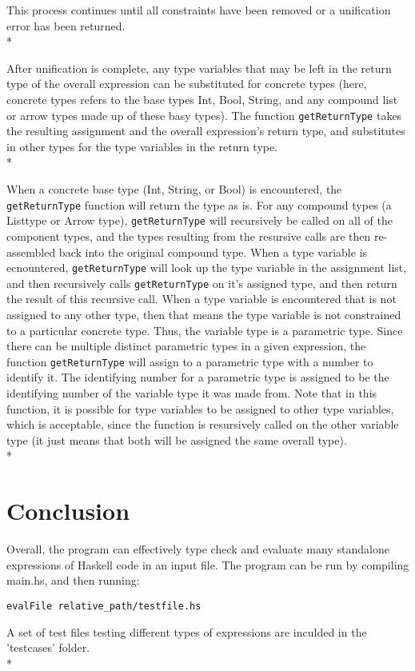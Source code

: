 \documentclass[11pt]{article}
\begin{document}
This process continues until all constraints have been removed or a unification error has been returned.\\*

After unification is complete, any type variables that may be left in the return type of the overall expression can be substituted for concrete types (here, concrete types refers to the base types Int, Bool, String, and any compound list or arrow types made up of these basy types). The function \verb|getReturnType| takes the resulting assignment and the overall expression's return type, and substitutes in other types for the type variables in the return type.\\*

When a concrete base type (Int, String, or Bool) is encountered, the \verb|getReturnType| function will return the type as is. For any compound types (a Listtype or Arrow type), \verb|getReturnType| will recursively be called on all of the component types, and the types resulting from the resursive calls are then re-assembled back into the original compound type. When a type variable is ecnountered, \verb|getReturnType| will look up the type variable in the assignment list, and then recursively calls \verb|getReturnType| on it's assigned type, and then return the result of this recursive call. When a type variable is encountered that is not assigned to any other type, then that means the type variable is not constrained to a particular concrete type. Thus, the variable type is a parametric type. Since there can be multiple distinct parametric types in a given expression, the function  \verb|getReturnType| will assign to a parametric type with a number to identify it. The identifying number for a parametric type is assigned to be the identifying number of the variable type it was made from. Note that in this function, it is possible for type variables to be assigned to other type variables, which is acceptable, since the function is resursively called on the other variable type (it just means that both will be assigned the same overall type). \\*


\section*{Conclusion}
Overall, the program can effectively type check and evaluate many standalone expressions of Haskell code in an input file.  The program can be run by compiling main.hs, and then running:
\begin{verbatim}
evalFile relative_path/testfile.hs
\end{verbatim}
A set of test files testing different types of expressions are inculded in the 'testcases' folder. \\*
\end{document}
